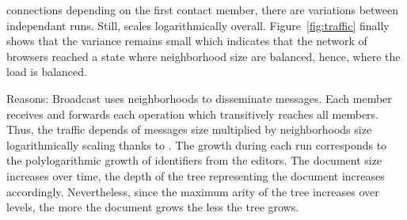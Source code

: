 \begin{asparadesc}
  connections depending on the first contact member, there are variations
  between independant runs. Still, \SPRAY scales logarithmically
  overall. Figure~\ref{fig:traffic} finally shows that the variance remains
  small which indicates that the network of browsers reached a state where
  neighborhood size are balanced, hence, where the load is balanced.
\item [Reasons:] Broadcast uses neighborhoods to disseminate messages. Each
  member receives and forwards each operation which transitively reaches all
  members. Thus, the traffic depends of messages size multiplied by
  neighborhoods size logarithmically scaling thanks to \SPRAY. The growth during
  each run corresponds to the polylogarithmic growth of identifiers from the
  editors. The document size increases over time, the depth of the \LSEQ tree
  representing the document increases accordingly. Nevertheless, since the
  maximum arity of the tree increases over levels, the more the document grows
  the less the tree grows.
\end{asparadesc}
